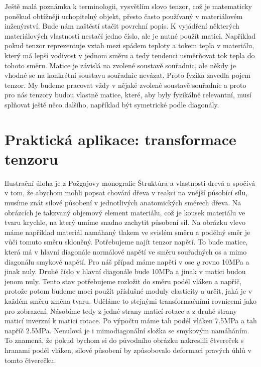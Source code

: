 \documentclass[12pt]{article}
\begin{document}
Ještě malá poznámka k terminologii, vysvětlím slovo tenzor, což je matematicky poněkud obtížněji uchopitelný objekt, přesto často používaný v materiálovém inženýrství. Bude nám naštěstí stačit povrchní popis. K vyjádření některých materiálových vlastností nestačí jedno číslo, ale je nutné použít matici. Například  pokud tenzor reprezentuje vztah mezi spádem teploty a tokem tepla v materiálu, který má lepší vodivost v jednom směru a tedy tendenci usměrňovat tok tepla do tohoto směru. Matice je závislá na zvolené soustavě souřadnic, ale někdy je vhodné se na konkrétní soustavu souřadnic nevázat. Proto fyzika zavedla pojem tenzor. My budeme pracovat vždy v nějaké zvolené soustavě souřadnic a proto pro nás tenzory budou vlastně matice, které, aby byly fyzikálně relevantní, musí splňovat ještě něco dalšího, například být symetrické podle diagonály. 

\section{Praktická aplikace: transformace tenzoru}

Ilustrační úloha je z Požgajovy monografie Štruktúra a vlastnosti drevá a spočívá v tom, že abychom mohli popsat chování dřeva v reakci na vnější působící sílu, musíme znát silové působení v jednotlivých anatomických směrech dřeva. Na obrázcích je takzvaný objemový element materiálu, což je kousek materiálu ve tvaru krychle, na který umíme snadno zachytit působení sil. Na obrázku vlevo máme například materiál namáhaný tlakem ve svislém směru a podélný směr je vůči tomuto směru skloněný. Potřebujeme najít tenzor napětí. To bude matice, která má v hlavní diagonále normálové napětí ve směru souřadných os a mimo diagonálu smykové napětí. Pro náš případ máme napětí v ose $y$ rovno 10MPa a jinak nuly. Druhé číslo v hlavní diagonále bude 10MPa a jinak v matici budou jenom nuly. Tento stav potřebujeme rozložit do směru podél vláken a napříč, protože potom budeme moci použít příslušné moduly elasticity a určit, jaká je v každém směru změna tvaru. Uděláme to stejnými transformačními rovnicemi jako pro zobrazení. Násobíme tedy z jedné strany maticí rotace a z druhé strany maticí inverzní k matici rotace. Po výpočtu máme tah podél vláken 7.5MPa a tah napříč 2.5MPa. Nenulová je i mimodiagonální složka se smykovým namáháním. To znamená, že pokud bychom si do původního obrázku nakreslili čtvereček s hranami podél vláken, silové působení by způsobovalo deformaci pravých úhlů v tomto čtverečku. 
\end{document}
